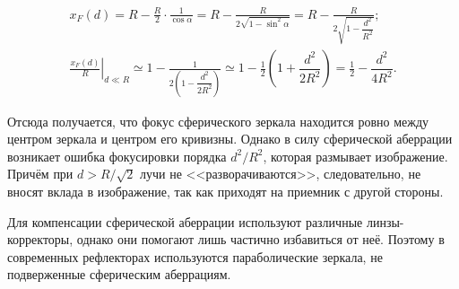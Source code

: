 \begin{gather*}
    x_F(d) = R - \frac{R}{2} \cdot \frac{1}{\cos\alpha} = R - \frac{R}{2\sqrt{1 - \sin^2 \alpha}}  = R  - \frac{R}{2\sqrt{1 - \dfrac{d^2}{R^2}}};\\
    \left. \frac{x_F(d)}{R} \right|_{d \ll R} \simeq  1  - \frac{1}{2\left(1 - \dfrac{d^2}{2R^2} \right)} \simeq  1 - \frac{1}{2}\left(1 + \dfrac{d^2}{2R^2} \right)  = \frac{1}{2} -  \dfrac{d^2}{4R^2}.
\end{gather*}
\begin{figure}
    \centering
    \vspace{-.5pc}
    \caption{}
\end{figure}
Отсюда получается, что фокус сферического зеркала находится ровно между центром зеркала и центром его кривизны. Однако в силу сферической аберрации возникает ошибка фокусировки порядка $d^2/R^2$, которая размывает изображение. Причём при $d > R/\sqrt{2}$ лучи не <<разворачиваются>>, следовательно, не вносят вклада в изображение, так как приходят на приемник с другой стороны.

Для компенсации сферической аберрации используют различные линзы-коррек\-торы, однако они помогают лишь частично избавиться от неё. Поэтому в современных рефлекторах используются параболические зеркала, не подверженные сферическим аберрациям.

